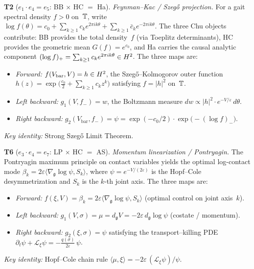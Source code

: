\begin{theorem}
\medskip\noindent
\textbf{T2}\; ($e_1 \cdot e_4 = e_5$: BB $\times$ HC $=$ Ha).
\emph{Feynman--Kac / Szeg\H{o} projection.}\;
For a gait spectral density $f > 0$ on~$\mathbb{T}$, write
$\log f(\theta) = c_0 + \sum_{k \geq 1} c_k e^{2\pi i k\theta}
  + \sum_{k \geq 1} \bar{c}_k e^{-2\pi i k\theta}$.
The three Chu objects contribute:
BB provides the total density~$f$ (via Toeplitz determinants),
HC provides the geometric mean $G(f) = e^{c_0}$,
and Ha carries the causal analytic component
$(\log f)_+ = \sum_{k \geq 1} c_k e^{2\pi i k\theta} \in H^2$.
The three maps are:
\begin{itemize}[nosep]
\item \emph{Forward:}\;
  $f(V_{\mathrm{bar}}, V) = h \in H^2$, the Szeg\H{o}--Kolmogorov
  outer function
  $h(z) = \exp\!\bigl(\tfrac{c_0}{2} + \sum_{k \geq 1} c_k z^k\bigr)$
  satisfying $f = |h|^2$ on~$\mathbb{T}$.
\item \emph{Left backward:}\;
  $g_1(V, f_-) = w$, the Boltzmann measure
  $dw \propto |h|^2 \cdot e^{-V/\varepsilon}\,d\theta$.
\item \emph{Right backward:}\;
  $g_2(V_{\mathrm{bar}}, f_-) = \psi
  = \exp(-c_0/2)\cdot\exp\!\bigl(-(\log f)_-\bigr)$.
\end{itemize}
\emph{Key identity:} Strong Szeg\H{o} Limit Theorem.

\medskip\noindent
\textbf{T6}\; ($e_3 \cdot e_4 = e_7$: LP $\times$ HC $=$ AS).
\emph{Momentum linearization / Pontryagin.}\;
The Pontryagin maximum principle on contact variables yields
the optimal log-contact mode
$\beta_k = 2\varepsilon\langle \nabla_{\mathfrak{g}} \log\psi,
  S_k \rangle$,
where $\psi = e^{-V/(2\varepsilon)}$ is the Hopf--Cole
desymmetrization and $S_k$ is the $k$-th joint axis.
The three maps are:
\begin{itemize}[nosep]
\item \emph{Forward:}\;
  $f(\xi, V) = \beta_k
  = 2\varepsilon\langle \nabla_{\mathfrak{g}} \log\psi, S_k \rangle$
  \quad (optimal control on joint axis~$k$).
\item \emph{Left backward:}\;
  $g_1(V, \sigma) = \mu = d_{\mathfrak{g}} V
  = -2\varepsilon\, d_{\mathfrak{g}} \log\psi$
  \quad (costate / momentum).
\item \emph{Right backward:}\;
  $g_2(\xi, \sigma) = \psi$ satisfying the transport--killing PDE
  $\partial_t \psi + \mathcal{L}_\xi \psi
  = -\tfrac{q(\sigma)}{2\varepsilon}\,\psi$.
\end{itemize}
\emph{Key identity:} Hopf--Cole chain rule
$\langle \mu, \xi \rangle = -2\varepsilon\,
  (\mathcal{L}_\xi \psi)/\psi$.
\end{theorem}

